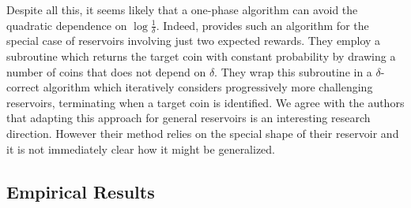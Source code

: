 Despite all this, it seems likely that a one-phase algorithm can avoid the
quadratic dependence on $\log \frac{1}{\delta}$.
Indeed, \cite{jamieson2016power}
provides such an algorithm for the special case of reservoirs involving just
two expected rewards.
They employ a subroutine which 
returns the target coin with constant probability
by drawing a number of coins that does not depend on $\delta$.
They wrap this subroutine in a $\delta$-correct algorithm which iteratively
considers progressively more challenging reservoirs,
terminating when
a target coin is identified.
We agree with the authors that adapting this approach for general reservoirs is
an interesting research direction.
However their method relies on the special
shape of their reservoir
and it is not immediately clear how it might be generalized.


%

%

\subsection{Empirical Results}\label{sec-empirical}

